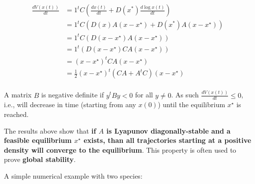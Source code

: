 \documentclass[
]{book}
\newenvironment{Shaded}{\begin{snugshade}}{\end{snugshade}}
\newcommand{\CommentTok}[1]{\textcolor[rgb]{0.56,0.35,0.01}{\textit{#1}}}
\newcommand{\DecValTok}[1]{\textcolor[rgb]{0.00,0.00,0.81}{#1}}
\newcommand{\KeywordTok}[1]{\textcolor[rgb]{0.13,0.29,0.53}{\textbf{#1}}}
\newcommand{\NormalTok}[1]{#1}
\newcommand{\OperatorTok}[1]{\textcolor[rgb]{0.81,0.36,0.00}{\textbf{#1}}}
\newcommand{\StringTok}[1]{\textcolor[rgb]{0.31,0.60,0.02}{#1}}
\begin{document}
\[
\begin{aligned}
 \frac{d V(x(t))}{dt} &= 1^t C \left(\frac{d x(t)}{dt}  + D(x^*) \frac{d \log x(t)}{dt} \right)\\
 &= 1^t C \left(D(x) A (x - x^\star)  + D(x^*) A (x - x^\star) \right)\\
 &= 1^t C \left(D(x - x^\star)  A (x - x^\star) \right)\\
 &= 1^t \left(D(x - x^\star)  C A (x - x^\star) \right)\\
 &= (x - x^\star)^t  CA (x - x^\star)\\
 &= \frac{1}{2}(x - x^\star)^t  (CA + A^t C) (x - x^\star)\\
\end{aligned}
\]

A matrix \(B\) is negative definite if \(y^t B y < 0\) for all \(y \neq 0\). As such \(\frac{d V(x(t))}{dt} \leq 0\), i.e., will decrease in time (starting from any \(x(0)\)) until the equilibrium \(x^\star\) is reached.

The results above show that \textbf{if \(A\) is Lyapunov diagonally-stable and a feasible equilibrium \(x^\star\) exists, than all trajectories starting at a positive density will converge to the equilibrium}. This property is often used to prove \textbf{global stability}.

A simple numerical example with two species:

\begin{Shaded}
\end{Shaded}
\end{document}
